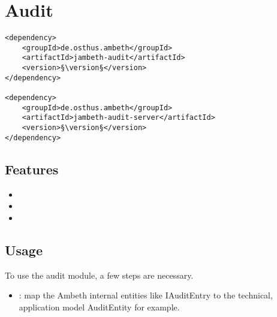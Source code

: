 \section{Audit}
\label{module:Audit}
\ClearAPI
\begin{lstlisting}[style=POM,caption={Maven modules to use \emph{Ambeth Audit}}]
<dependency>
	<groupId>de.osthus.ambeth</groupId>
	<artifactId>jambeth-audit</artifactId>
	<version>§\version§</version>
</dependency>

<dependency>
	<groupId>de.osthus.ambeth</groupId>
	<artifactId>jambeth-audit-server</artifactId>
	<version>§\version§</version>
</dependency>
\end{lstlisting}
\TODO
\subsection{Features}
\begin{itemize}
	\item {}
	\item {}
	\item {}
\end{itemize}
\subsection{Usage}
To use the audit module, a few steps are necessary.
\begin{itemize}

	\item {}: map the Ambeth internal entities like IAuditEntry to the technical, application model AuditEntity for example.


	
\end{itemize}

